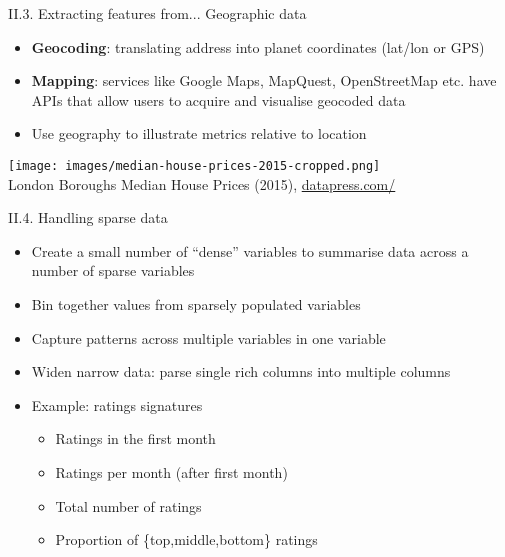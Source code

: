 \documentclass[handout]{beamer}
\newcommand{\strong}[1]{\textbf{\color{teal} #1}}
\newcommand{\stronger}[1]{\textbf{\color{purple} #1}}
\begin{document}
\begin{frame}{II.3. Extracting features from... Geographic data}
\begin{itemize}
\item \stronger{Geocoding}: translating address into planet coordinates (lat/lon or GPS)
\item \strong{Mapping}: services like Google Maps, MapQuest, OpenStreetMap etc. have APIs that allow users to acquire and visualise geocoded data
\item Use geography to illustrate metrics relative to location
\end{itemize}
\begin{center}
\texttt{[image: images/median-house-prices-2015-cropped.png]}\\
\tiny{London Boroughs Median House Prices (2015), \url{datapress.com/}}
\end{center}
\end{frame}
\begin{frame}{II.4. Handling sparse data}
\begin{itemize}
\item Create a small number of ``dense'' variables to summarise data across a number of sparse variables
\item Bin together values from sparsely populated variables
\item Capture patterns across multiple variables in one variable
\item Widen narrow data: parse single rich columns into multiple columns
\item Example: ratings signatures
	\begin{itemize}
	\item Ratings in the first month
	\item Ratings per month (after first month)
	\item Total number of ratings
	\item Proportion of \{top,middle,bottom\} ratings
	\end{itemize}
\end{itemize}
\end{frame}
\end{document}
